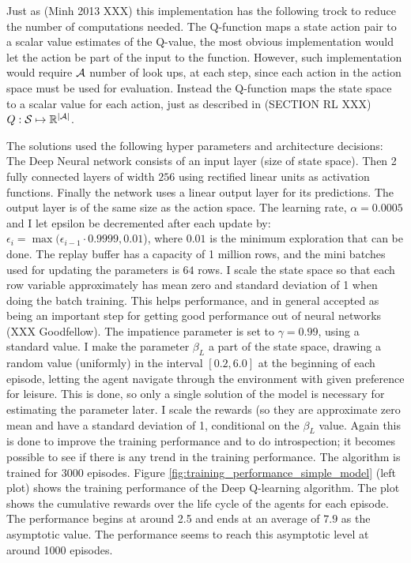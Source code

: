 Just as (Minh 2013 XXX) this implementation has the following trock to reduce the number of computations needed. The Q-function maps a state action pair to a scalar value estimates of the Q-value, the most obvious implementation would let the action be part of the input to the function. However, such implementation would require $\mathcal{A}$ number of look ups, at each step, since each action in the action space must be used for evaluation. Instead the Q-function maps the state space to a scalar value for each action, just as described in (SECTION RL XXX) $Q: \mathcal{S} \mapsto \mathbb{R}^{\mid \mathcal{A} \mid}$. 

The solutions used the following hyper parameters and architecture decisions: The Deep Neural network consists of an input layer (size of state space). Then  2 fully connected layers of width $256$ using rectified linear units as activation functions. Finally the network uses a linear output layer for its predictions. The output layer is of the same size as the action space. The learning rate, $\alpha=0.0005$ and I let epsilon be decremented after each update by: $\epsilon_i = \max (\epsilon_{i-1} \cdot 0.9999, 0.01$), where $0.01$ is the minimum exploration that can be done. The replay buffer has a capacity of 1 million rows, and the mini batches used for updating the parameters is $64$ rows. I scale the state space so that each row variable approximately has mean zero and standard deviation of 1 when doing the batch training. This helps performance, and in general accepted as being an important step for getting good performance out of neural networks (XXX Goodfellow). The impatience parameter is set to $\gamma=0.99$, using a standard value. I make the parameter $\beta_L$ a part of the state space, drawing a random value (uniformly) in the interval $[0.2, 6.0]$ at the beginning of each episode, letting the agent navigate through the environment with given preference for leisure. This is done, so only a single solution of the model is necessary for estimating the parameter later. I scale the rewards (so they are approximate zero mean and have a standard deviation of 1, conditional on the $\beta_L$ value. Again this is done to improve the training performance and to do introspection; it becomes possible to see if there is any trend in the training performance. The algorithm is trained for 3000 episodes. Figure \ref{fig:training_performance_simple_model}  (left plot) shows the training performance of the Deep Q-learning algorithm. The plot shows the cumulative rewards over the life cycle of the agents for each episode. The performance begins at around 2.5 and ends at an average of $7.9$ as the asymptotic value. The performance seems to reach this asymptotic level at around 1000 episodes.

